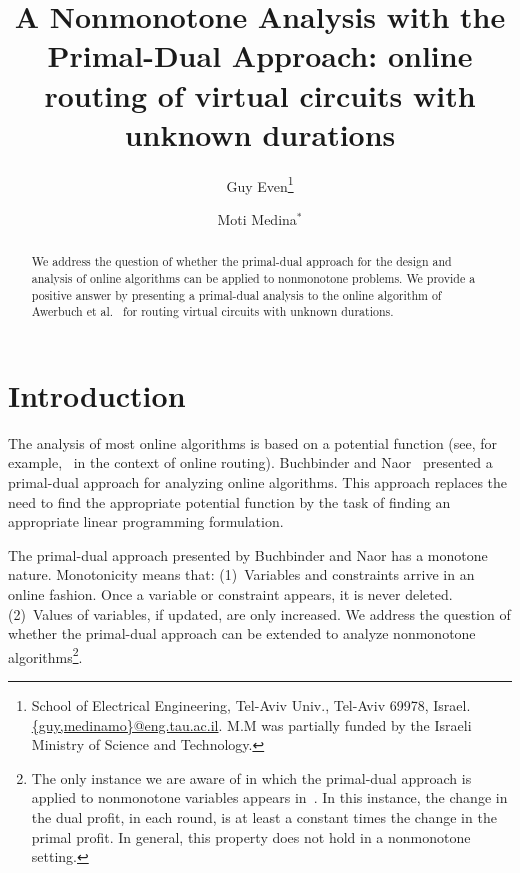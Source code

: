 \documentclass[11pt]{article}
\newenvironment{proof sketch}[1]{\noindent {\emph{Proof sketch of #1:}}}{\hfill \qed}
\begin{document}
\title{A Nonmonotone Analysis with the Primal-Dual Approach: online routing of virtual circuits with unknown durations}

\author{Guy Even\thanks{School of Electrical Engineering, Tel-Aviv
Univ., Tel-Aviv 69978, Israel.
\protect\url{{guy,medinamo}@eng.tau.ac.il}.\newline
M.M was partially funded
by the Israeli Ministry of Science and Technology.} \and Moti Medina$^*$
}
\date{}
\maketitle

\begin{abstract}
  We address the question of whether the primal-dual approach for the
  design and analysis of online algorithms can be applied to
  nonmonotone problems. We provide a positive answer by presenting a
  primal-dual analysis to the online algorithm of Awerbuch
  et al.~\cite{awerbuch2001competitive} for routing virtual circuits with unknown durations.
\end{abstract}



\section{Introduction}
The analysis of most online algorithms is based on a potential
function (see, for example,~\cite{AAP, azar1997line, aspnes1997line, awerbuch2001competitive} in the context of online routing).
Buchbinder and Naor~\cite{BNsurvey} presented a primal-dual approach for
analyzing online algorithms.  This approach replaces the need to find
the appropriate potential function by the task of finding an
appropriate linear programming formulation.

The primal-dual approach presented by Buchbinder and Naor has a
monotone nature.  Monotonicity means that: (1)~Variables and
constraints arrive in an online fashion. Once a variable or constraint
appears, it is never deleted. (2)~Values of variables, if updated, are
only increased.  We address the question of whether the primal-dual
approach can be extended to analyze nonmonotone
algorithms\footnote{The only instance we are aware of in which the
  primal-dual approach is applied to nonmonotone variables appears
  in~\cite{buchbinder2011frequency}. In this instance, the change in
  the dual profit, in each round, is at least a constant times the change in the
  primal profit. In general, this property does not hold in a nonmonotone setting.}.
\end{document}
